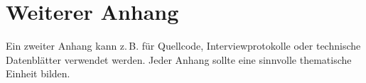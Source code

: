 \chapter{Weiterer Anhang}

Ein zweiter Anhang kann z.\,B. für Quellcode, Interviewprotokolle oder technische Datenblätter verwendet werden. Jeder Anhang sollte eine sinnvolle thematische Einheit bilden.